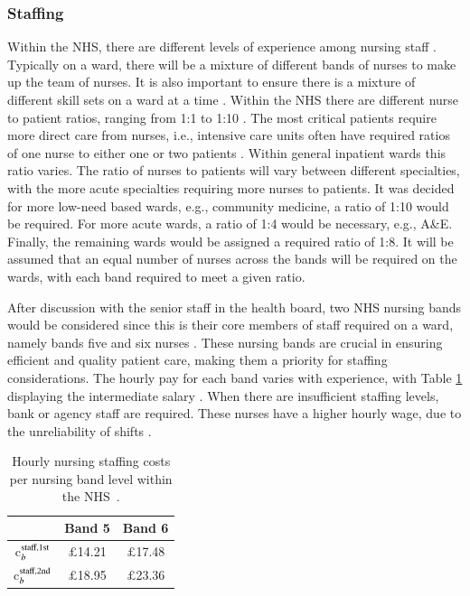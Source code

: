 \documentclass[../thesis.tex]{subfiles}
\begin{document}
\subsubsection{Staffing}\label{sec:ABUHBstaffing}
Within the NHS, there are different levels of experience among nursing staff \cite{NHS2022}. Typically on a ward, there will be a mixture of different bands of nurses to make up the team of nurses. It is also important to ensure there is a mixture of different skill sets on a ward at a time \cite{Jones2015}. Within the NHS there are different nurse to patient ratios, ranging from 1:1 to 1:10 \cite{UHS}. The most critical patients require more direct care from nurses, i.e., intensive care units often have required ratios of one nurse to either one or two patients \cite{Kean2013}. Within general inpatient wards this ratio varies. The ratio of nurses to patients will vary between different specialties, with the more acute specialties requiring more nurses to patients. It was decided for more low-need based wards, e.g., community medicine, a ratio of 1:10 would be required. For more acute wards, a ratio of 1:4 would be necessary, e.g., A\&E. Finally, the remaining wards would be assigned a required ratio of 1:8. It will be assumed that an equal number of nurses across the bands will be required on the wards, with each band required to meet a given ratio.

After discussion with the senior staff in the health board, two NHS nursing bands would be considered since this is their core members of staff required on a ward, namely bands five and six nurses \cite{East2014}. These nursing bands are crucial in ensuring efficient and quality patient care, making them a priority for staffing considerations. The hourly pay for each band varies with experience, with Table \ref{tab:nhsbands} displaying the intermediate salary \cite{NHSEmployers2021}. When there are insufficient staffing levels, bank or agency staff are required. These nurses have a higher hourly wage, due to the unreliability of shifts \cite{OHNFT2023}. 

\begin{table}[h!]
    \centering
    \begin{tabular}{ccc}\toprule
         & \textbf{Band 5} & \textbf{Band 6} \\\midrule
       c$^{\textnormal{staff,1st}}_{b}$  & $\pounds$14.21 & $\pounds$17.48\\
         c$^{\textnormal{staff,2nd}}_{b}$ & $\pounds$18.95 & $\pounds$23.36 \\ \bottomrule
    \end{tabular}
    \caption{Hourly nursing staffing costs per nursing band level within the NHS~\cite{NHSEmployers2021,OHNFT2023}.}
    \label{tab:nhsbands}
\end{table}
\end{document}
